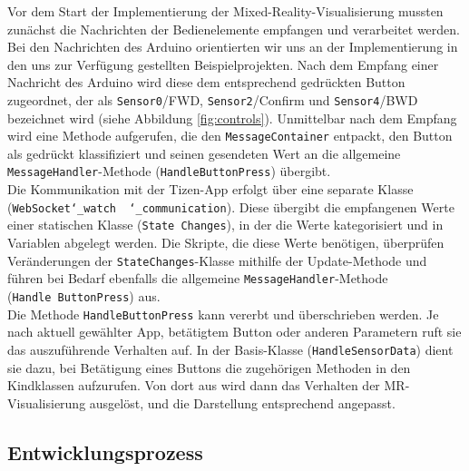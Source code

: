 \documentclass[11pt, a4paper]{article}
\begin{document}
Vor dem Start der Implementierung der Mixed-Reality-Visualisierung mussten zunächst die Nachrichten der Bedienelemente empfangen und verarbeitet werden. Bei den Nachrichten des Arduino orientierten wir uns an der Implementierung in den uns zur Verfügung gestellten Beispielprojekten. Nach dem Empfang einer Nachricht des Arduino wird diese dem entsprechend gedrückten Button zugeordnet, der als \texttt{Sensor0}/FWD, \texttt{Sensor2}/Confirm und \texttt{Sensor4}/BWD bezeichnet wird (siehe Abbildung \ref{fig:controls}). Unmittelbar nach dem Empfang wird eine Methode aufgerufen, die den \texttt{MessageContainer} entpackt, den Button als gedrückt klassifiziert und seinen gesendeten Wert an die allgemeine \texttt{MessageHandler}-Methode (\texttt{HandleButtonPress}) übergibt.\\
Die Kommunikation mit der Tizen-App erfolgt über eine separate Klasse (\texttt{WebSocket\char`_watch \ \char`_communication}). Diese übergibt die empfangenen Werte einer statischen Klasse (\texttt{State\ Changes}), in der die Werte kategorisiert und in Variablen abgelegt werden. Die Skripte, die diese Werte benötigen, überprüfen Veränderungen der \texttt{StateChanges}-Klasse mithilfe der Update-Methode und führen bei Bedarf ebenfalls die allgemeine \texttt{MessageHandler}-Methode (\texttt{Handle\ ButtonPress}) aus.\\
Die Methode \texttt{HandleButtonPress} kann vererbt und überschrieben werden. Je nach aktuell gewählter App, betätigtem Button oder anderen Parametern ruft sie das auszuführende Verhalten auf. In der Basis-Klasse (\texttt{HandleSensorData}) dient sie dazu, bei Betätigung eines Buttons die zugehörigen Methoden in den Kindklassen aufzurufen. Von dort aus wird dann das Verhalten der MR-Visualisierung ausgelöst, und die Darstellung entsprechend angepasst.

\subsection{Entwicklungsprozess}
\end{document}
